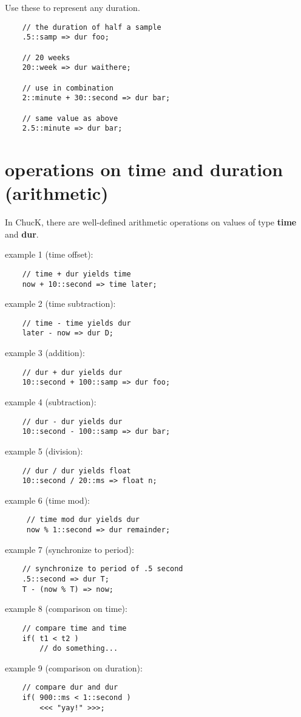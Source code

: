 Use these to represent any duration.

\begin{verbatim}
    // the duration of half a sample
    .5::samp => dur foo;

    // 20 weeks
    20::week => dur waithere;

    // use in combination
    2::minute + 30::second => dur bar;

    // same value as above
    2.5::minute => dur bar;
\end{verbatim}

\section{operations on time and duration (arithmetic)}

In ChucK, there are well-defined arithmetic operations on values of type {\bf time} and {\bf dur}.

example 1 (time offset):
\begin{verbatim}
    // time + dur yields time
    now + 10::second => time later;
\end{verbatim}

example 2 (time subtraction):
\begin{verbatim}
    // time - time yields dur
    later - now => dur D;
\end{verbatim}
example 3 (addition):
\begin{verbatim}
    // dur + dur yields dur
    10::second + 100::samp => dur foo;
\end{verbatim}
example 4 (subtraction):
\begin{verbatim}
    // dur - dur yields dur
    10::second - 100::samp => dur bar;
\end{verbatim}
example 5 (division):
\begin{verbatim}
    // dur / dur yields float
    10::second / 20::ms => float n;
\end{verbatim}
example 6 (time mod):
\begin{verbatim}
     // time mod dur yields dur
     now % 1::second => dur remainder;
\end{verbatim}
example 7 (synchronize to period):
\begin{verbatim}
    // synchronize to period of .5 second
    .5::second => dur T;
    T - (now % T) => now;
\end{verbatim}
example 8 (comparison on time):
\begin{verbatim}
    // compare time and time
    if( t1 < t2 )
        // do something...
\end{verbatim}
example 9 (comparison on duration):
\begin{verbatim}
    // compare dur and dur
    if( 900::ms < 1::second )
        <<< "yay!" >>>;
\end{verbatim}

